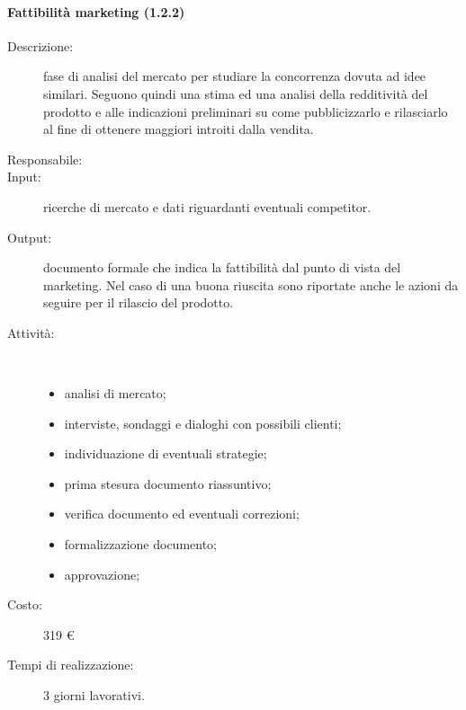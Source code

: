 \begin{description}
\paragraph{Fattibilit\`{a} marketing (1.2.2)}
\begin{description}
\item[Descrizione:] fase di analisi del mercato per studiare la concorrenza dovuta ad idee similari. Seguono quindi una stima ed una analisi della redditivit\`{a} del prodotto e alle indicazioni preliminari su come pubblicizzarlo e rilasciarlo al fine di ottenere maggiori introiti dalla vendita.
\item[Responsabile:] 
\item[Input:] ricerche di mercato e dati riguardanti eventuali competitor.
\item[Output:] documento formale che indica la fattibilità dal punto di vista del marketing. Nel caso di una buona riuscita sono riportate anche le azioni da seguire per il rilascio del prodotto.
\item[Attività:]\mbox{}\\[-1.5\baselineskip]
	\begin{itemize}
	\item analisi di mercato;
	\item interviste, sondaggi e dialoghi con possibili clienti;
	\item individuazione di eventuali strategie;
	\item prima stesura documento riassuntivo;
	\item verifica documento ed eventuali correzioni;
	\item formalizzazione documento;
	\item approvazione;
	\end{itemize}

\item[Costo:] 319 \euro{}
\item[Tempi di realizzazione:] 3 giorni lavorativi.
\end{description}

\end{description}
